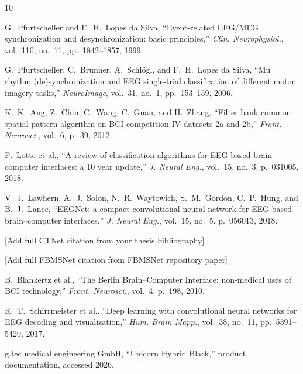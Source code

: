 \documentclass[conference]{IEEEtran}
\begin{document}
\begin{thebibliography}{10}

G.~Pfurtscheller and F.~H.~Lopes da Silva, ``Event-related EEG/MEG synchronization and desynchronization: basic principles,'' \emph{Clin. Neurophysiol.}, vol.~110, no.~11, pp.~1842--1857, 1999.

G.~Pfurtscheller, C.~Brunner, A.~Schl{\"o}gl, and F.~H.~Lopes da Silva, ``Mu rhythm (de)synchronization and EEG single-trial classification of different motor imagery tasks,'' \emph{NeuroImage}, vol.~31, no.~1, pp.~153--159, 2006.

K.~K.~Ang, Z.~Chin, C.~Wang, C.~Guan, and H.~Zhang, ``Filter bank common spatial pattern algorithm on BCI competition IV datasets 2a and 2b,'' \emph{Front. Neurosci.}, vol.~6, p.~39, 2012.

F.~Lotte et al., ``A review of classification algorithms for EEG-based brain--computer interfaces: a 10 year update,'' \emph{J. Neural Eng.}, vol.~15, no.~3, p.~031005, 2018.

V.~J.~Lawhern, A.~J.~Solon, N.~R.~Waytowich, S.~M.~Gordon, C.~P.~Hung, and B.~J.~Lance, ``EEGNet: a compact convolutional neural network for EEG-based brain--computer interfaces,'' \emph{J. Neural Eng.}, vol.~15, no.~5, p.~056013, 2018.

[Add full CTNet citation from your thesis bibliography]

[Add full FBMSNet citation from FBMSNet repository paper]

B.~Blankertz et al., ``The Berlin Brain--Computer Interface: non-medical uses of BCI technology,'' \emph{Front. Neurosci.}, vol.~4, p.~198, 2010.

R.~T.~Schirrmeister et al., ``Deep learning with convolutional neural networks for EEG decoding and visualization,'' \emph{Hum. Brain Mapp.}, vol.~38, no.~11, pp.~5391--5420, 2017.

g.tec medical engineering GmbH, ``Unicorn Hybrid Black,'' product documentation, accessed 2026.

\end{thebibliography}
\end{document}
